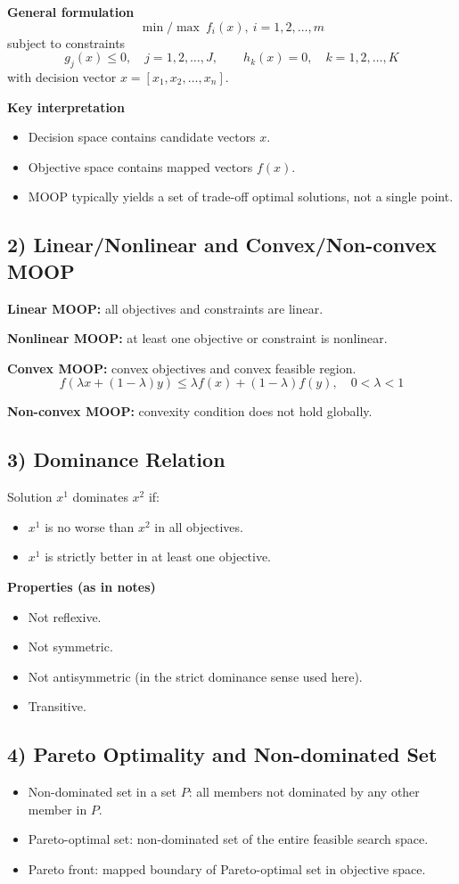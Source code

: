 \documentclass[11pt,a4paper]{article}
\begin{document}
\textbf{General formulation}
\[
\min/\max\ f_i(x),\ i=1,2,\dots,m
\]
subject to constraints
\[
g_j(x)\le 0,\quad j=1,2,\dots,J,
\qquad
h_k(x)=0,\quad k=1,2,\dots,K
\]
with decision vector $x=[x_1,x_2,\dots,x_n]$.

\textbf{Key interpretation}
\begin{itemize}
\item Decision space contains candidate vectors $x$.
\item Objective space contains mapped vectors $f(x)$.
\item MOOP typically yields a set of trade-off optimal solutions, not a single point.
\end{itemize}

\subsection*{2) Linear/Nonlinear and Convex/Non-convex MOOP}
\textbf{Linear MOOP:} all objectives and constraints are linear.

\textbf{Nonlinear MOOP:} at least one objective or constraint is nonlinear.

\textbf{Convex MOOP:} convex objectives and convex feasible region.
\[
f(\lambda x+(1-\lambda)y)\le \lambda f(x)+(1-\lambda)f(y),\quad 0<\lambda<1
\]

\textbf{Non-convex MOOP:} convexity condition does not hold globally.

\subsection*{3) Dominance Relation}
Solution $x^1$ dominates $x^2$ if:
\begin{itemize}
\item $x^1$ is no worse than $x^2$ in all objectives.
\item $x^1$ is strictly better in at least one objective.
\end{itemize}

\textbf{Properties (as in notes)}
\begin{itemize}
\item Not reflexive.
\item Not symmetric.
\item Not antisymmetric (in the strict dominance sense used here).
\item Transitive.
\end{itemize}

\subsection*{4) Pareto Optimality and Non-dominated Set}
\begin{itemize}
\item Non-dominated set in a set $P$: all members not dominated by any other member in $P$.
\item Pareto-optimal set: non-dominated set of the entire feasible search space.
\item Pareto front: mapped boundary of Pareto-optimal set in objective space.
\end{itemize}
\end{document}

